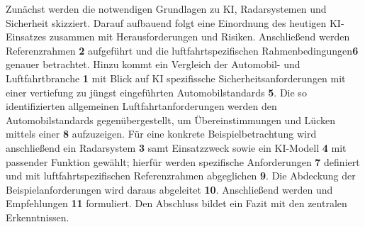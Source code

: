 Zunächst werden die notwendigen Grundlagen zu KI, Radarsystemen und Sicherheit
skizziert.
Darauf aufbauend folgt eine Einordnung des heutigen KI-Einsatzes zusammen mit 
Herausforderungen und Risiken.
Anschließend werden Referenzrahmen \textbf{2} aufgeführt und die luftfahrtspezifischen 
Rahmenbedingungen\textbf{6} genauer betrachtet. 
Hinzu kommt ein Vergleich der Automobil- und Luftfahrtbranche \textbf{1} mit Blick auf 
KI spezifissche Sicherheitsanforderungen mit einer vertiefung zu jüngst eingeführten 
Automobilstandards \textbf{5}. 
Die so identifizierten allgemeinen Luftfahrtanforderungen werden den
Automobilstandards gegenübergestellt, um Übereinstimmungen und Lücken mittels einer  \textbf{8} aufzuzeigen.
Für eine konkrete Beispielbetrachtung wird anschließend ein Radarsystem \textbf{3} samt
Einsatzzweck sowie ein KI-Modell \textbf{4} mit passender Funktion gewählt; hierfür werden spezifische
Anforderungen \textbf{7} definiert und mit luftfahrtspezifischen Referenzrahmen 
abgeglichen \textbf{9}. 
Die Abdeckung der Beispielanforderungen wird daraus abgeleitet \textbf{10}.
Anschließend werden und Empfehlungen \textbf{11} formuliert. Den Abschluss bildet ein
Fazit mit den zentralen Erkenntnissen.

